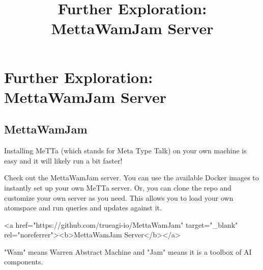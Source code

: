 \documentclass{article}
\title{Further Exploration: MettaWamJam Server}
\begin{document}
\section{Further Exploration: MettaWamJam Server}

\subsection{MettaWamJam}

Installing MeTTa (which stands for Meta Type Talk) on your own machine is easy and it will likely run a bit faster!

Check out the MettaWamJam server. You can use the available Docker images to instantly set up your own MeTTa server. Or, you can clone the repo and customize your own server as you need. This allows you to load your own
atomspace and run queries and updates against it.

<a href="https://github.com/trueagi-io/MettaWamJam" target="_blank" rel="noreferrer"><b>MettaWamJam Server</b></a>

"Wam" means Warren Abstract Machine and "Jam" means it is a toolbox of AI components.
\end{document}
